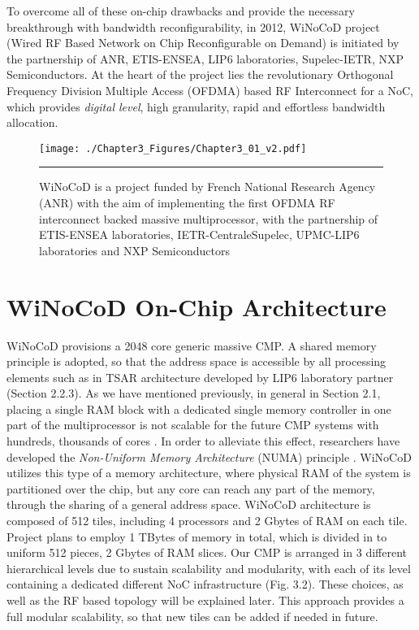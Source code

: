 To overcome all of these on-chip drawbacks and provide the necessary breakthrough with bandwidth reconfigurability, in 2012, WiNoCoD project (Wired RF Based Network on Chip Reconfigurable on Demand) is initiated by the partnership of ANR, ETIS-ENSEA, LIP6 laboratories, Supelec-IETR, NXP Semiconductors. At the heart of the project lies the revolutionary Orthogonal Frequency Division Multiple Access (OFDMA) based RF Interconnect for a NoC, which provides \textit{digital level}, high granularity, rapid and effortless bandwidth allocation.

\begin{figure}[htbp]
  \centering
    \texttt{[image: ./Chapter3\_Figures/Chapter3\_01\_v2.pdf]}
    \rule{35em}{0.5pt}
  \caption[WiNoCoD Project]{WiNoCoD is a project funded by French National Research Agency (ANR) with the aim of implementing the first OFDMA RF interconnect backed massive multiprocessor, with the partnership of ETIS-ENSEA laboratories, IETR-CentraleSupelec, UPMC-LIP6 laboratories and NXP Semiconductors}
  \label{fig:Electron}
\end{figure}

\section{WiNoCoD On-Chip Architecture}


WiNoCoD provisions a 2048 core generic massive CMP. A shared memory principle is adopted, so that the address space is accessible by all processing elements such as in TSAR architecture developed by LIP6 laboratory partner (Section 2.2.3). As we have mentioned previously, in general in Section 2.1, placing a single RAM block with a dedicated single memory controller in one part of the multiprocessor is not scalable for the future CMP systems with hundreds, thousands of cores \cite{blagodurov2010case}. In order to alleviate this effect, researchers have developed the \textit{Non-Uniform Memory Architecture} (NUMA) principle \cite{kurian2010atac}. WiNoCoD utilizes this type of a memory architecture, where physical RAM of the system is partitioned over the chip, but any core can reach any part of the memory, through the sharing of a general address space. WiNoCoD architecture is composed of 512 tiles, including 4 processors and 2 Gbytes of RAM on each tile. Project plans to employ 1 TBytes of memory in total, which is divided in to uniform 512 pieces, 2 Gbytes of RAM slices. Our CMP is arranged in 3 different hierarchical levels due to sustain scalability and modularity, with each of its level containing a dedicated different NoC infrastructure (Fig. 3.2). These choices, as well as the RF based topology will be explained later. This approach provides a full modular scalability, so that new tiles can be added if needed in future.   


